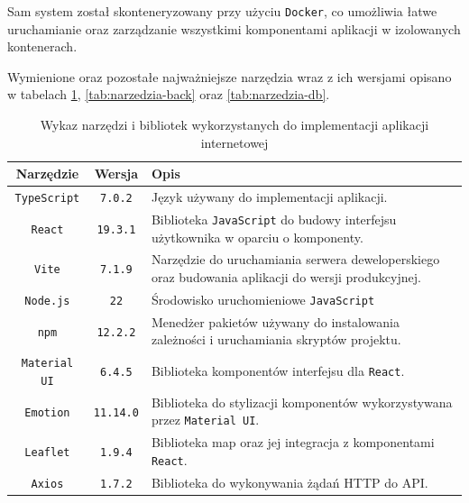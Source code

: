 Sam system został skonteneryzowany przy użyciu \texttt{Docker}, co umożliwia łatwe uruchamianie oraz zarządzanie wszystkimi komponentami aplikacji w izolowanych kontenerach.

Wymienione oraz pozostałe najważniejsze narzędzia wraz z ich wersjami opisano w tabelach \ref{tab:narzedzia-front}, \ref{tab:narzedzia-back} oraz \ref{tab:narzedzia-db}.
\begin{table}[htb]
\small
\centering
\caption{Wykaz narzędzi i bibliotek wykorzystanych do implementacji aplikacji internetowej}
\label{tab:narzedzia-front}
\begin{tabularx}{\linewidth}{|c|c|X|} \hline
Narzędzie & Wersja & Opis \\ \hline\hline
\texttt{TypeScript} & \texttt{7.0.2} & Język używany do implementacji aplikacji. \\ \hline
\texttt{React} & \texttt{19.3.1} & Biblioteka \texttt{JavaScript} do budowy interfejsu użytkownika w oparciu o komponenty.  \\ \hline
\texttt{Vite} & \texttt{7.1.9} & Narzędzie do uruchamiania serwera deweloperskiego oraz budowania aplikacji do wersji produkcyjnej. \\ \hline
\texttt{Node.js} & \texttt{22} & Środowisko uruchomieniowe \texttt{JavaScript} \\ \hline
\texttt{npm} & \texttt{12.2.2} & Menedżer pakietów używany do instalowania zależności i uruchamiania skryptów projektu. \\ \hline
\texttt{Material UI} & \texttt{6.4.5} & Biblioteka komponentów interfejsu dla \texttt{React}. \\ \hline
\texttt{Emotion} & \texttt{11.14.0} & Biblioteka do stylizacji komponentów wykorzystywana przez \texttt{Material UI}. \\ \hline
\texttt{Leaflet} & \texttt{1.9.4} & Biblioteka map oraz jej integracja z komponentami \texttt{React}. \\ \hline
\texttt{Axios} & \texttt{1.7.2} & Biblioteka do wykonywania żądań HTTP do API. \\ \hline
\end{tabularx}
\end{table}

